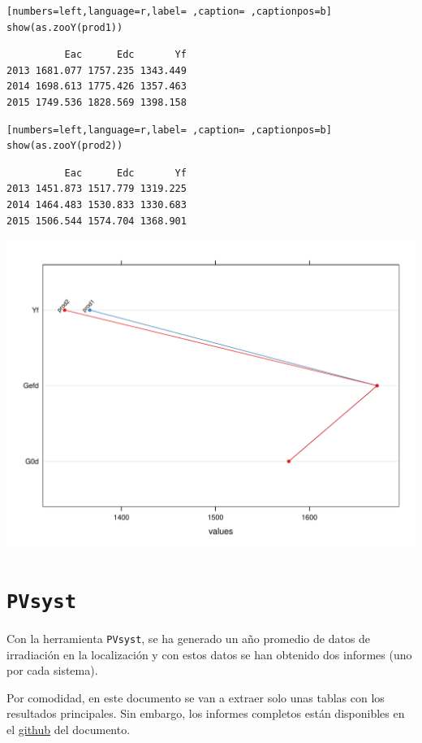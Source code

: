 \begin{lstlisting}[numbers=left,language=r,label= ,caption= ,captionpos=b]
show(as.zooY(prod1))
\end{lstlisting}

\begin{verbatim}
          Eac      Edc       Yf
2013 1681.077 1757.235 1343.449
2014 1698.613 1775.426 1357.463
2015 1749.536 1828.569 1398.158
\end{verbatim}


\begin{lstlisting}[numbers=left,language=r,label= ,caption= ,captionpos=b]
show(as.zooY(prod2))
\end{lstlisting}

\begin{verbatim}
          Eac      Edc       Yf
2013 1451.873 1517.779 1319.225
2014 1464.483 1530.833 1330.683
2015 1506.544 1574.704 1368.901
\end{verbatim}


\begin{center}
\includegraphics[width=.9\linewidth]{figuras/ejemplos2.pdf}
\end{center}
\section{\texttt{PVsyst}}
\label{sec:orgbc183ba}
Con la herramienta \texttt{PVsyst}, se ha generado un año promedio de datos de irradiación en la localización y con estos datos se han obtenido dos informes (uno por cada sistema).

Por comodidad, en este documento se van a extraer solo unas tablas con los resultados principales. Sin embargo, los informes completos están disponibles en el \href{https://github.com/solarization/TFG\_Francisco\_Delgado\_Lopez}{github} del documento.

